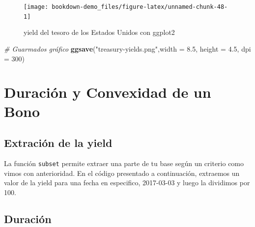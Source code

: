 \documentclass[12pt,]{book}
\newenvironment{Shaded}{\begin{snugshade}}{\end{snugshade}}
\newcommand{\KeywordTok}[1]{\textcolor[rgb]{0.13,0.29,0.53}{\textbf{#1}}}
\newcommand{\DataTypeTok}[1]{\textcolor[rgb]{0.13,0.29,0.53}{#1}}
\newcommand{\DecValTok}[1]{\textcolor[rgb]{0.00,0.00,0.81}{#1}}
\newcommand{\FloatTok}[1]{\textcolor[rgb]{0.00,0.00,0.81}{#1}}
\newcommand{\StringTok}[1]{\textcolor[rgb]{0.31,0.60,0.02}{#1}}
\newcommand{\CommentTok}[1]{\textcolor[rgb]{0.56,0.35,0.01}{\textit{#1}}}
\newcommand{\OperatorTok}[1]{\textcolor[rgb]{0.81,0.36,0.00}{\textbf{#1}}}
\newcommand{\NormalTok}[1]{#1}
\begin{document}
\begin{figure}

{\centering \texttt{[image: bookdown-demo\_files/figure-latex/unnamed-chunk-48-1]} 

}

\caption{yield del tesoro de los Estados Unidos con ggplot2}\label{fig:unnamed-chunk-48}
\end{figure}

\begin{Shaded}
\begin{Highlighting}[]
\CommentTok{# Guarmados gráfico}
\KeywordTok{ggsave}\NormalTok{(}\StringTok{"treasury-yields.png"}\NormalTok{,}\DataTypeTok{width =} \FloatTok{8.5}\NormalTok{, }\DataTypeTok{height =} \FloatTok{4.5}\NormalTok{, }\DataTypeTok{dpi =} \DecValTok{300}\NormalTok{)}
\end{Highlighting}
\end{Shaded}

\section{Duración y Convexidad de un
Bono}\label{duracion-y-convexidad-de-un-bono}

\subsection{Extración de la yield}\label{extracion-de-la-yield}

La función \texttt{subset} permite extraer una parte de tu base según un
criterio como vimos con anterioridad. En el código presentado a
continuación, extraemos un valor de la yield para una fecha en
especifico, 2017-03-03 y luego la dividimos por 100.

\begin{Shaded}
\end{Shaded}

\subsection{Duración}\label{duracion}
\end{document}
